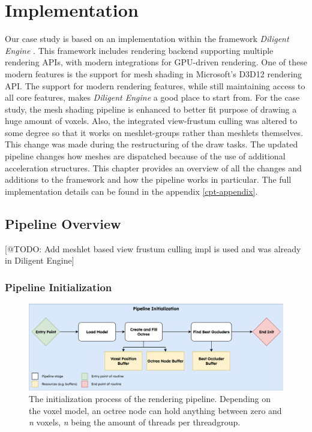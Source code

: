 \chapter{Implementation} \label{cpt-implementation}

Our case study is based on an implementation within the framework \emph{Diligent Engine} 
\cite{DiligentGraphicsGitHub, DiligentGraphics}. This framework includes rendering backend supporting 
multiple rendering \ac{API}s, with modern integrations for \ac{GPU}-driven rendering. One of these modern 
features is the support for mesh shading in Microsoft's D3D12 rendering \ac{API}. The support for modern 
rendering features, while still maintaining access to all core features, makes \emph{Diligent Engine} a good 
place to start from. For the case study, the mesh shading pipeline is enhanced to better fit purpose of drawing 
a huge amount of voxels. Also, the integrated view-frustum culling was altered to some degree so that it works on 
meshlet-groups rather than meshlets themselves. This change was made during the restructuring of the draw tasks. 
The updated pipeline changes how meshes are dispatched because of the use of additional acceleration structures. 
This chapter provides an overview of all the changes and additions to the framework and how the pipeline works 
in particular. The full implementation details can be found in the appendix \ref{cpt-appendix}.

\section{Pipeline Overview} \label{sec-piepline-initialization}

[@TODO: Add meshlet based view frustum culling impl is used and was already in Diligent Engine]

\subsection*{Pipeline Initialization} \label{subsec-piepline-initialization}

\begin{figure}[h]
    \centering
    \includegraphics[width=\linewidth]{images/graphics/pipeline-initialization.jpg}
    \caption{The initialization process of the rendering pipeline. Depending on the voxel model, an octree node 
    can hold anything between zero and \emph{n} voxels, \emph{n} being the amount of threads per threadgroup.}
    \label{fig:pipeline-initialization}
\end{figure}

